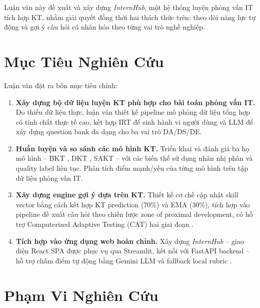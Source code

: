 \documentclass[12pt, a4paper]{report}
\newcommand{\system}{\textit{InternHub}}
\begin{document}
Luận văn này đề xuất và xây dựng \system{}, một hệ thống luyện phỏng vấn IT tích hợp KT, nhằm giải quyết đồng thời hai thách thức trên: theo dõi năng lực tự động và gợi ý câu hỏi cá nhân hóa theo từng vai trò nghề nghiệp.

\section{Mục Tiêu Nghiên Cứu}
\label{sec:objectives}

Luận văn đặt ra bốn mục tiêu chính:

\begin{enumerate}
  \item \textbf{Xây dựng bộ dữ liệu luyện KT phù hợp cho bài toán phỏng vấn IT.} Do thiếu dữ liệu thực, luận văn thiết kế pipeline mô phỏng dữ liệu tổng hợp có tính chất thực tế cao, kết hợp IRT \cite{embretson2000item} để sinh hành vi người dùng và LLM để xây dựng question bank đa dạng cho ba vai trò DA/DS/DE.

  \item \textbf{Huấn luyện và so sánh các mô hình KT.} Triển khai và đánh giá ba họ mô hình -- BKT \cite{corbett1994knowledge}, DKT \cite{piech2015deep}, SAKT \cite{pandey2019self} -- với các biến thể sử dụng nhãn nhị phân và quality label liên tục. Phân tích điểm mạnh/yếu của từng mô hình trên tập dữ liệu phỏng vấn IT.

  \item \textbf{Xây dựng engine gợi ý dựa trên KT.} Thiết kế cơ chế cập nhật skill vector bằng cách kết hợp KT prediction (70\%) và EMA (30\%), tích hợp vào pipeline đề xuất câu hỏi theo chiến lược zone of proximal development, có hỗ trợ Computerized Adaptive Testing (CAT) hai giai đoạn \cite{wainer2000computerized}.

  \item \textbf{Tích hợp vào ứng dụng web hoàn chỉnh.} Xây dựng \system{} -- giao diện React SPA được phục vụ qua Streamlit, kết nối với FastAPI backend -- hỗ trợ chấm điểm tự động bằng Gemini LLM và fallback local rubric \cite{team2023gemini}.
\end{enumerate}

\section{Phạm Vi Nghiên Cứu}
\label{sec:scope}
\end{document}
